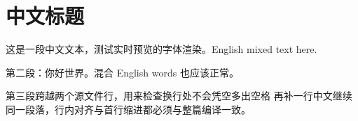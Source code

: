 \documentclass{ctexart}
\begin{document}
\section{中文标题}
这是一段中文文本，测试实时预览的字体渲染。English mixed text here.

第二段：你好世界。混合 English words 也应该正常。

第三段跨越两个源文件行，用来检查换行处不会凭空多出空格
再补一行中文继续同一段落，行内对齐与首行缩进都必须与整篇编译一致。
\end{document}
